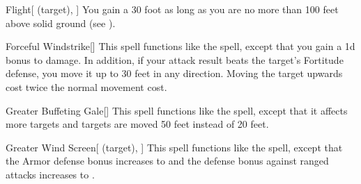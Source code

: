 \lowercase{\hypertarget{spell:Flight}{}}\label{spell:Flight}
\begin{attuneability}[Rank 5]{\hypertarget{spell:Flight}{Flight}}[ (target), ]
You gain a 30 foot  as long as you are no more than 100 feet above solid ground (see ).
\end{attuneability}
\vspace{0.25em}



\lowercase{\hypertarget{spell:Forceful Windstrike}{}}\label{spell:Forceful Windstrike}
\begin{freeability}[Rank 5]{\hypertarget{spell:Forceful Windstrike}{Forceful Windstrike}}[]
This spell functions like the  spell, except that you gain a \plus1d bonus to damage.
In addition, if your attack result beats the target's Fortitude defense, you move it up to 30 feet in any direction.
Moving the target upwards cost twice the normal movement cost.
\end{freeability}
\vspace{0.25em}



\lowercase{\hypertarget{spell:Greater Buffeting Gale}{}}\label{spell:Greater Buffeting Gale}
\begin{freeability}[Rank 5]{\hypertarget{spell:Greater Buffeting Gale}{Greater Buffeting Gale}}[]
This spell functions like the  spell, except that it affects more targets and targets are moved 50 feet instead of 20 feet.
\end{freeability}
\vspace{0.25em}



\lowercase{\hypertarget{spell:Greater Wind Screen}{}}\label{spell:Greater Wind Screen}
\begin{attuneability}[Rank 5]{\hypertarget{spell:Greater Wind Screen}{Greater Wind Screen}}[ (target), ]
This spell functions like the  spell, except that the Armor defense bonus increases to  and the defense bonus against ranged attacks increases to .
\end{attuneability}
\vspace{0.25em}



